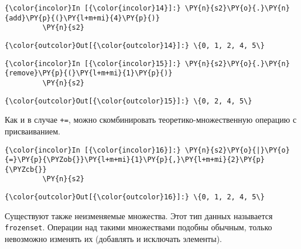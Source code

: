     \begin{Verbatim}[commandchars=\\\{\}]
{\color{incolor}In [{\color{incolor}14}]:} \PY{n}{s2}\PY{o}{.}\PY{n}{add}\PY{p}{(}\PY{l+m+mi}{4}\PY{p}{)}
         \PY{n}{s2}
\end{Verbatim}

            \begin{Verbatim}[commandchars=\\\{\}]
{\color{outcolor}Out[{\color{outcolor}14}]:} \{0, 1, 2, 4, 5\}
\end{Verbatim}
        
    \begin{Verbatim}[commandchars=\\\{\}]
{\color{incolor}In [{\color{incolor}15}]:} \PY{n}{s2}\PY{o}{.}\PY{n}{remove}\PY{p}{(}\PY{l+m+mi}{1}\PY{p}{)}
         \PY{n}{s2}
\end{Verbatim}

            \begin{Verbatim}[commandchars=\\\{\}]
{\color{outcolor}Out[{\color{outcolor}15}]:} \{0, 2, 4, 5\}
\end{Verbatim}
        
    Как и в случае \texttt{+=}, можно скомбинировать теоретико-множественную
операцию с присваиванием.

    \begin{Verbatim}[commandchars=\\\{\}]
{\color{incolor}In [{\color{incolor}16}]:} \PY{n}{s2}\PY{o}{|}\PY{o}{=}\PY{p}{\PYZob{}}\PY{l+m+mi}{1}\PY{p}{,}\PY{l+m+mi}{2}\PY{p}{\PYZcb{}}
         \PY{n}{s2}
\end{Verbatim}

            \begin{Verbatim}[commandchars=\\\{\}]
{\color{outcolor}Out[{\color{outcolor}16}]:} \{0, 1, 2, 4, 5\}
\end{Verbatim}
        
    Существуют также неизменяемые множества. Этот тип данных называется
\texttt{frozenset}. Операции над такими множествами подобны обычным,
только невозможно изменять их (добавлять и исключать элементы).
